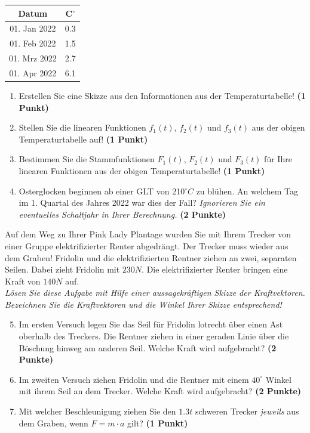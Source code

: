 \documentclass[a4paper, 10pt]{scrartcl}\usepackage[]{graphicx}\usepackage[]{xcolor}
\begin{document}
\begin{center}
\begin{tabular}{cc}
  \toprule
  Datum & C$^\circ$ \\
  \midrule
  01. Jan 2022 & 0.3\\
  01. Feb 2022 & 1.5\\
  01. Mrz 2022 & 2.7\\
  01. Apr 2022 & 6.1\\
  \bottomrule
\end{tabular}
\end{center}

\begin{enumerate}
\item Erstellen Sie eine Skizze aus den Informationen aus der
  Temperaturtabelle!  \textbf{(1 Punkt)}
\item Stellen Sie die linearen Funktionen $f_1(t)$, $f_2(t)$ und
  $f_3(t)$ aus der obigen Temperaturtabelle auf!  \textbf{(1 Punkt)}
\item Bestimmen Sie die Stammfunktionen $F_1(t)$, $F_2(t)$ und $F_3(t)$ f{\"u}r
  Ihre linearen Funktionen aus der obigen Temperaturtabelle!  \textbf{(1
    Punkt)}
\item Osterglocken beginnen ab einer GLT von 210$^\circ C$ zu bl{\"u}hen. An
  welchem Tag im 1. Quartal des Jahres 2022 war dies der
  Fall? \textit{Ignorieren Sie ein eventuelles Schaltjahr in Ihrer Berechnung.} \textbf{(2 Punkte)}
\end{enumerate}

Auf dem Weg zu Ihrer Pink Lady Plantage wurden Sie mit Ihrem Trecker von
einer Gruppe elektrifizierter Renter abgedr{\"a}ngt. Der Trecker muss wieder
aus dem Graben! Fridolin und die elektrifizierten Rentner ziehen an zwei,
separaten Seilen. Dabei zieht Fridolin mit $230N$. Die
elektrifizierter Renter  bringen eine Kraft von $140N$ auf.\\

\textit{L{\"o}sen Sie diese Aufgabe mit Hilfe einer aussagekr{\"a}ftigen Skizze der
  Kraftvektoren. Bezeichnen Sie die Kraftvektoren und die Winkel Ihrer
  Skizze entsprechend!}

\begin{enumerate}
  \setcounter{enumi}{4}  
\item Im ersten Versuch legen Sie das Seil f{\"u}r Fridolin lotrecht {\"u}ber einen
  Ast oberhalb des Treckers. Die Rentner ziehen in einer geraden Linie {\"u}ber
  die B{\"o}schung hinweg am anderen Seil. Welche Kraft wird aufgebracht?
  \textbf{(2 Punkte)}
\item Im zweiten Versuch ziehen Fridolin und die Rentner mit einem
  $40^\circ$ Winkel mit ihrem Seil an dem Trecker. Welche Kraft
  wird aufgebracht? \textbf{(2 Punkte)}
\item Mit welcher Beschleunigung ziehen Sie den $1.3t$ schweren
  Trecker \textit{jeweils} aus dem Graben, wenn $F = m \cdot a$ gilt?
  \textbf{(1 Punkt)}
\end{enumerate}
\end{document}
